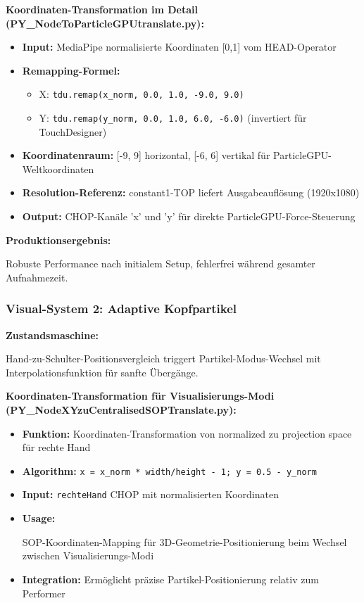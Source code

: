 \textbf{Koordinaten-Transformation im Detail (PY\_NodeToParticleGPUtranslate.py):}
\begin{itemize}
    \item \textbf{Input:} MediaPipe normalisierte Koordinaten [0,1] vom HEAD-Operator
    \item \textbf{Remapping-Formel:} 
    \begin{itemize}
        \item X: \texttt{tdu.remap(x\_norm, 0.0, 1.0, -9.0, 9.0)}
        \item Y: \texttt{tdu.remap(y\_norm, 0.0, 1.0, 6.0, -6.0)} (invertiert für TouchDesigner)
    \end{itemize}
    \item \textbf{Koordinatenraum:} [-9, 9] horizontal, [-6, 6] vertikal für ParticleGPU-Weltkoordinaten
    \item \textbf{Resolution-Referenz:} constant1-TOP liefert Ausgabeauflösung (1920x1080)
    \item \textbf{Output:} CHOP-Kanäle 'x' und 'y' für direkte ParticleGPU-Force-Steuerung
\end{itemize}

\textbf{Produktionsergebnis:} \raggedright Robuste Performance nach initialem Setup, fehlerfrei während gesamter Aufnahmezeit.

\subsubsection{Visual-System 2: Adaptive Kopfpartikel}

\textbf{Zustandsmaschine:} \raggedright Hand-zu-Schulter-Positionsvergleich triggert Partikel-Modus-Wechsel mit Interpolationsfunktion für sanfte Übergänge.

\textbf{Koordinaten-Transformation für Visualisierungs-Modi (PY\_NodeXYzuCentralisedSOPTranslate.py):}
\begin{itemize}
    \item \textbf{Funktion:} Koordinaten-Transformation von normalized zu projection space für rechte Hand
    \item \textbf{Algorithm:} \texttt{x = x\_norm * width/height - 1; y = 0.5 - y\_norm}
    \item \textbf{Input:} \texttt{rechteHand} CHOP mit normalisierten Koordinaten
    \item \textbf{Usage:} \raggedright SOP-Koordinaten-Mapping für 3D-Geometrie-Positionierung beim Wechsel zwischen Visualisierungs-Modi
    \item \textbf{Integration:} Ermöglicht präzise Partikel-Positionierung relativ zum Performer
\end{itemize}

